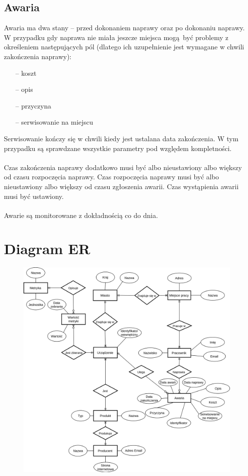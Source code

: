 \documentclass[a4paper, 12pt]{article}
\begin{document}
        \subsection{Awaria}    
            Awaria ma dwa stany -- przed dokonaniem naprawy oraz po dokonaniu
            naprawy. W przypadku gdy naprawa nie miała jeszcze miejsca mogą być 
            problemy z określeniem następujących pól (dlatego ich uzupełnienie 
            jest wymagane w chwili zakończenia naprawy):
            \begin{itemize}
                \item[--] koszt
                \item[--] opis
                \item[--] przyczyna
                \item[--] serwisowanie na miejscu
            \end{itemize}
            Serwisowanie kończy się w chwili kiedy jest ustalana data zakończenia.
            W tym przypadku są sprawdzane wszystkie parametry pod względem
            kompletności.
            \\ \\
            Czas zakończenia naprawy dodatkowo musi być albo nieustawiony albo 
            większy od czasu rozpoczęcia naprawy. Czas rozpoczęcia naprawy musi
            być albo nieustawiony albo większy od czasu zgłoszenia awarii. Czas
            wystąpienia awarii musi być ustawiony.
            \\ \\
            Awarie są monitorowane z dokładnością co do dnia.
    \section{Diagram ER} 
        \begin{figure}[H]
            \centering
            \includegraphics[width=\textwidth]{er.png}
        \end{figure} 
\end{document}

